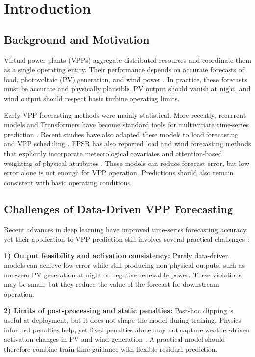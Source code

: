 \section{Introduction}

\subsection{Background and Motivation}
Virtual power plants (VPPs) aggregate distributed resources and coordinate them as a single operating entity. Their performance depends on accurate forecasts of load, photovoltaic (PV) generation, and wind power \cite{Ma2025,Cao2023,Qiu2024,Moreno2020,Wu2024}. In practice, these forecasts must be accurate and physically plausible. PV output should vanish at night, and wind output should respect basic turbine operating limits.

Early VPP forecasting methods were mainly statistical. More recently, recurrent models and Transformers have become standard tools for multivariate time-series prediction \cite{Zhou2021informer,Wu2021autoformer,Nie2023patchtst,Zeng2023}. Recent studies have also adapted these models to load forecasting and VPP scheduling \cite{Qiu2024,Ashraf2025,Du2025,Li2025MetaInformer}. EPSR has also reported load and wind forecasting methods that explicitly incorporate meteorological covariates and attention-based weighting of physical attributes \cite{Li2023PLF,Xiong2022Wind}. These models can reduce forecast error, but low error alone is not enough for VPP operation. Predictions should also remain consistent with basic operating conditions.

\subsection{Challenges of Data-Driven VPP Forecasting}
Recent advances in deep learning have improved time-series forecasting accuracy, yet their application to VPP prediction still involves several practical challenges \cite{Vle2025,Arabzadeh2025}:

\textbf{1) Output feasibility and activation consistency:} Purely data-driven models can achieve low error while still producing non-physical outputs, such as non-zero PV generation at night or negative renewable power. These violations may be small, but they reduce the value of the forecast for downstream operation.

\textbf{2) Limits of post-processing and static penalties:} Post-hoc clipping is useful at deployment, but it does not shape the model during training. Physics-informed penalties help, yet fixed penalties alone may not capture weather-driven activation changes in PV and wind generation \cite{Raissi2019,Li2026,Asinyo2025}. A practical model should therefore combine train-time guidance with flexible residual prediction.

